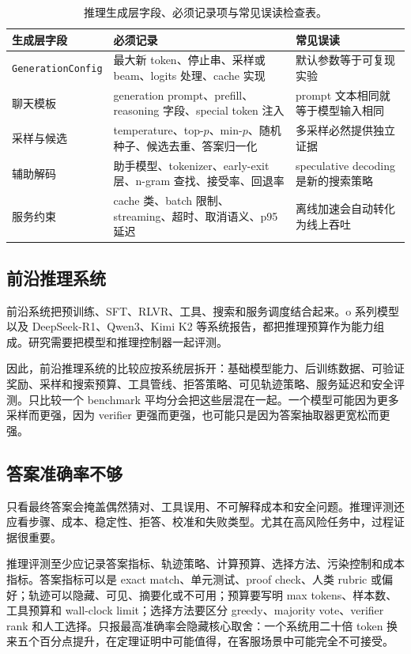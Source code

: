\documentclass[UTF8,zihao=-4,openany]{ctexbook}
\begin{document}
\begin{table}[t]
\centering
\small
\begin{tabular}{@{}>{\raggedright\arraybackslash}p{}>{\raggedright\arraybackslash}p{}>{\raggedright\arraybackslash}p{}@{}}
\toprule
生成层字段 & 必须记录 & 常见误读 \\
\midrule
\texttt{GenerationConfig} & 最大新 token、停止串、采样或 beam、logits 处理、cache 实现 & 默认参数等于可复现实验 \\
聊天模板 & generation prompt、prefill、reasoning 字段、special token 注入 & prompt 文本相同就等于模型输入相同 \\
采样与候选 & temperature、top-$p$、min-$p$、随机种子、候选去重、答案归一化 & 多采样必然提供独立证据 \\
辅助解码 & 助手模型、tokenizer、early-exit 层、n-gram 查找、接受率、回退率 & speculative decoding 是新的搜索策略 \\
服务约束 & cache 类、batch 限制、streaming、超时、取消语义、p95 延迟 & 离线加速会自动转化为线上吞吐 \\
\bottomrule
\end{tabular}
\caption{推理生成层字段、必须记录项与常见误读检查表。}
\label{tab:zh-generation-config-audit}
\end{table}

\subsection{前沿推理系统}
前沿系统把预训练、SFT、RLVR、工具、搜索和服务调度结合起来。o 系列模型以及 DeepSeek-R1、Qwen3、Kimi K2 等系统报告，都把推理预算作为能力组成。研究需要把模型和推理控制器一起评测。

因此，前沿推理系统的比较应按系统层拆开：基础模型能力、后训练数据、可验证奖励、采样和搜索预算、工具管线、拒答策略、可见轨迹策略、服务延迟和安全评测。只比较一个 benchmark 平均分会把这些层混在一起。一个模型可能因为更多采样而更强，因为 verifier 更强而更强，也可能只是因为答案抽取器更宽松而更强。

\subsection{答案准确率不够}
只看最终答案会掩盖偶然猜对、工具误用、不可解释成本和安全问题。推理评测还应看步骤、成本、稳定性、拒答、校准和失败类型。尤其在高风险任务中，过程证据很重要。

推理评测至少应记录答案指标、轨迹策略、计算预算、选择方法、污染控制和成本指标。答案指标可以是 exact match、单元测试、proof check、人类 rubric 或偏好；轨迹可以隐藏、可见、摘要化或不可用；预算要写明 max tokens、样本数、工具预算和 wall-clock limit；选择方法要区分 greedy、majority vote、verifier rank 和人工选择。只报最高准确率会隐藏核心取舍：一个系统用二十倍 token 换来五个百分点提升，在定理证明中可能值得，在客服场景中可能完全不可接受。
\end{document}
